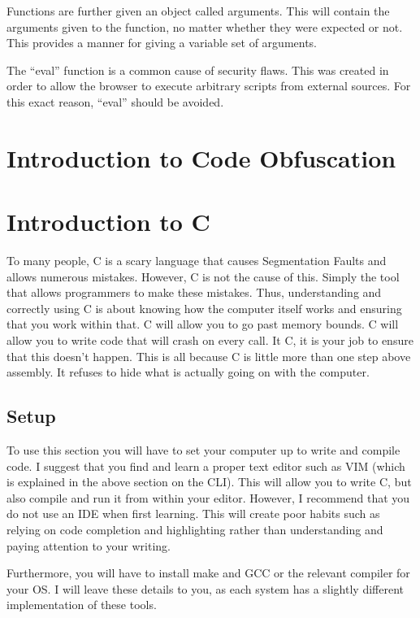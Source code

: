\documentclass[a4paper,11pt]{report}
\begin{document}
			Functions are further given an object called arguments. 
			This will contain the arguments given to the function, no matter whether they were expected or not. 
			This provides a manner for giving a variable set of arguments. 

			The ``eval'' function is a common cause of security flaws. 
			This was created in order to allow the browser to execute arbitrary scripts from external sources. 
			For this exact reason, ``eval'' should be avoided. 
	\section{Introduction to Code Obfuscation}
	\section{Introduction to C}
		To many people, C is a scary language that causes Segmentation Faults and allows numerous mistakes. 
		However, C is not the cause of this. Simply the tool that allows programmers to make these mistakes. 
		Thus, understanding and correctly using C is about knowing how the computer itself works and ensuring that you work within that. 
		C will allow you to go past memory bounds. 
		C will allow you to write code that will crash on every call. 
		It C, it is your job to ensure that this doesn't happen. 
		This is all because C is little more than one step above assembly. 
		It refuses to hide what is actually going on with the computer. 

		\subsection{Setup}
			To use this section you will have to set your computer up to write and compile code. 
			I suggest that you find and learn a proper text editor such as VIM (which is explained in the above section on the CLI).
			This will allow you to write C, but also compile and run it from within your editor. 
			However, I recommend that you do not use an IDE when first learning. 
			This will create poor habits such as relying on code completion and highlighting rather than understanding and paying attention to your writing. 

			Furthermore, you will have to install make and GCC or the relevant compiler for your OS. 
			I will leave these details to you, as each system has a slightly different implementation of these tools. 
\end{document}
